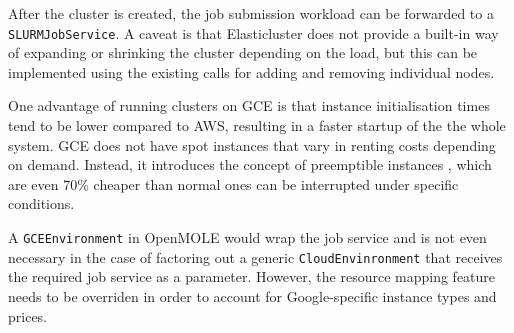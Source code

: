After the cluster is created, the job submission workload can be forwarded to a \verb|SLURMJobService|. A caveat is that Elasticluster does not provide a built-in way of expanding or shrinking the cluster depending on the load, but this can be implemented using the existing calls for adding and removing individual nodes.

One advantage of running clusters on GCE is that instance initialisation times tend to be lower compared to AWS, resulting in a faster startup of the the whole system. GCE does not have spot instances that vary in renting costs depending on demand. Instead, it introduces the concept of preemptible instances \cite{Preemptible}, which are even 70\% cheaper than normal ones can be interrupted under specific conditions.

A \verb|GCEEnvironment| in OpenMOLE would wrap the job service and is not even necessary in the case of factoring out a generic \verb|CloudEnvinronment| that receives the required job service as a parameter. However, the resource mapping feature needs to be overriden in order to account for Google-specific instance types and prices.